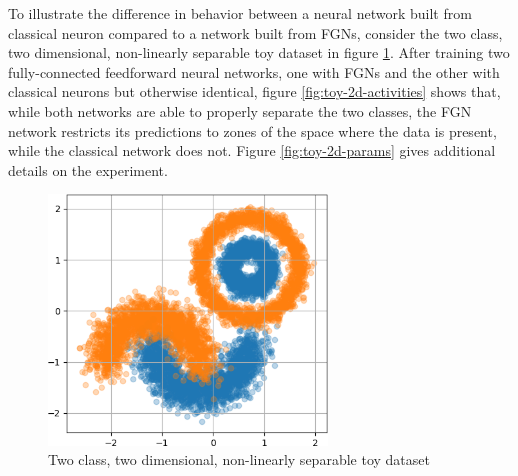 \documentclass[12pt,oneside]{CUNY_PhD}
\begin{document}
To illustrate the difference in behavior between a neural network built from classical neuron compared to a network built from FGNs, consider the two class, two dimensional, non-linearly separable toy dataset in figure \ref{fig:toy-2d-data}. After training two fully-connected feedforward neural networks, one with FGNs and the other with classical neurons but otherwise identical, figure \ref{fig:toy-2d-activities} shows that, while both networks are able to properly separate the two classes, the FGN network restricts its predictions to zones of the space where the data is present, while the classical network does not. Figure \ref{fig:toy-2d-params} gives additional details on the experiment.

\begin{figure}[!t]
    \centering
        \includegraphics[width=0.66\textwidth]{images/2D-network-toy/2d-toy-data.png}
    \caption{Two class, two dimensional, non-linearly separable toy dataset}
    \label{fig:toy-2d-data}
\end{figure}
\end{document}
